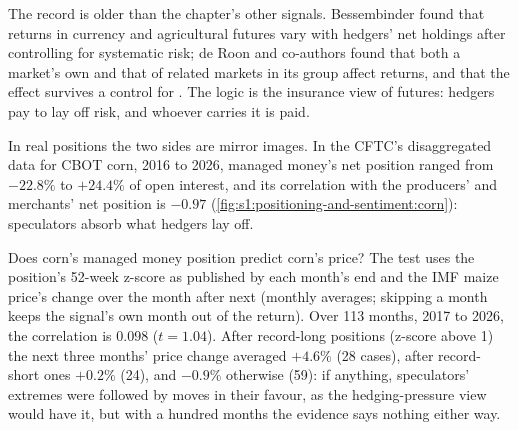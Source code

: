 The record is older than the chapter's other signals. Bessembinder found that returns in currency and agricultural futures vary with hedgers' net
holdings after controlling for systematic risk; de Roon and co-authors found that both a market's own  and that of related markets in
its group affect returns, and that the effect survives a control for . The logic is the insurance view of futures: hedgers pay to lay off
risk, and whoever carries it is paid.

In real positions the two sides are mirror images. In the CFTC's disaggregated data for CBOT corn, 2016 to 2026, managed money's net position ranged
from $-22.8\%$ to $+24.4\%$ of open interest, and its correlation with the producers' and merchants' net position is $-0.97$
(\cref{fig:s1:positioning-and-sentiment:corn}): speculators absorb what hedgers lay off.

\begin{omfigure}

\label{fig:s1:positioning-and-sentiment:corn}
\end{omfigure}

Does corn's managed money position predict corn's price? The test uses the position's 52-week z-score as published by each month's end and the IMF
maize price's change over the month after next (monthly averages; skipping a month keeps the signal's own month out of the return). Over 113 months,
2017 to 2026, the correlation is 0.098 ($t = 1.04$). After record-long positions (z-score above 1) the next three months' price change averaged
$+4.6\%$ (28 cases), after record-short ones $+0.2\%$ (24), and $-0.9\%$ otherwise (59): if anything, speculators' extremes were followed by moves in
their favour, as the hedging-pressure view would have it, but with a hundred months the evidence says nothing either way.

